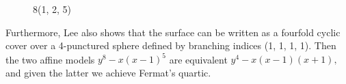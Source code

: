 \documentclass[12pt,reqno]{amsart}
\newtheorem{theorem}{Theorem}
\theoremstyle{definition}
\theoremstyle{remark}
\begin{document}
\begin{figure}[htbp]
    \centering
    \qquad
    \caption{8(1, 2, 5)}%
    \label{fig:125}%
\end{figure}

Furthermore, Lee also shows that the surface can be written as a fourfold cyclic cover over a 4-punctured sphere defined by branching indices (1, 1, 1, 1). Then the two affine models $y^8 - x(x - 1)^5$ are equivalent $y^4 - x (x - 1) (x + 1),$ and given the latter we achieve Fermat's quartic.



\end{document}
